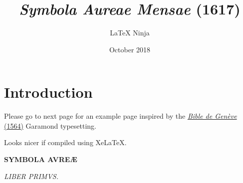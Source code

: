 \documentclass[paper=a6,11pt]{scrbook}
\title{\emph{Symbola Aureae Mensae} (1617)}
\author{\LaTeX{} Ninja}
\date{October 2018}
\begin{document}
\maketitle

\section*{Introduction} 
Please go to next page for an example page inspired by the  \href{https://github.com/raphink/geneve_1564}{\emph{Bible de Genève} (1564)} Garamond typesetting.

Looks nicer if compiled using XeLaTeX.

\newpage

\phantom{ }

\begin{figure}[H]
\end{figure}


\Centering
{\bfseries \textsc{{\Huge SYMBOLA AVREÆ} }} 

{\large\textit{LIBER PRIMVS.}}

\medskip


\justify
\fontsize{9.5pt}{11pt}\selectfont
\end{document}
